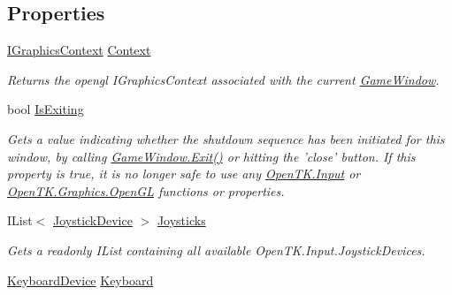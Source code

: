 \subsection*{Properties}
\begin{DoxyCompactItemize}
\item 
\hyperlink{interface_open_t_k_1_1_graphics_1_1_i_graphics_context}{I\-Graphics\-Context} \hyperlink{class_open_t_k_1_1_game_window_a5c17f9c8850e2c20c23bf855bb303cb1}{Context}
\begin{DoxyCompactList}\small\item\em Returns the opengl I\-Graphics\-Context associated with the current \hyperlink{class_open_t_k_1_1_game_window}{Game\-Window}. \end{DoxyCompactList}\item 
bool \hyperlink{class_open_t_k_1_1_game_window_a0ec80251b70858617ce91d3aa65a8174}{Is\-Exiting}
\begin{DoxyCompactList}\small\item\em Gets a value indicating whether the shutdown sequence has been initiated for this window, by calling \hyperlink{class_open_t_k_1_1_game_window_a67c26214c431300b56b0f4a88bbbd244}{Game\-Window.\-Exit()} or hitting the 'close' button. If this property is true, it is no longer safe to use any \hyperlink{namespace_open_t_k_1_1_input}{Open\-T\-K.\-Input} or \hyperlink{namespace_open_t_k_1_1_graphics_1_1_open_g_l}{Open\-T\-K.\-Graphics.\-Open\-G\-L} functions or properties. \end{DoxyCompactList}\item 
I\-List$<$ \hyperlink{class_open_t_k_1_1_input_1_1_joystick_device}{Joystick\-Device} $>$ \hyperlink{class_open_t_k_1_1_game_window_a97fe86dfe28cd8c059e53dc22a20458a}{Joysticks}
\begin{DoxyCompactList}\small\item\em Gets a readonly I\-List containing all available Open\-T\-K.\-Input.\-Joystick\-Devices. \end{DoxyCompactList}\item 
\hyperlink{class_open_t_k_1_1_input_1_1_keyboard_device}{Keyboard\-Device} \hyperlink{class_open_t_k_1_1_game_window_a1d5ef67f9be67c7355cacbde9872e09e}{Keyboard}

\end{DoxyCompactItemize}

